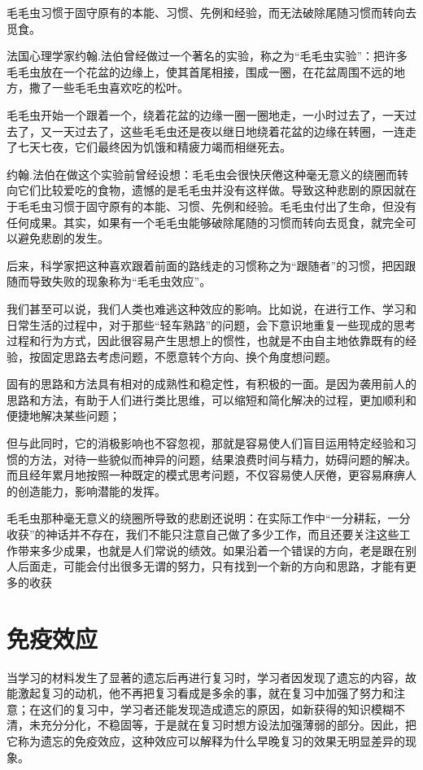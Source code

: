 \documentclass[11pt]{ctexart}
\begin{document}
毛毛虫习惯于固守原有的本能、习惯、先例和经验，而无法破除尾随习惯而转向去觅食。

法国心理学家约翰.法伯曾经做过一个著名的实验，称之为“毛毛虫实验”：把许多毛毛虫放在一个花盆的边缘上，使其首尾相接，围成一圈，在花盆周围不远的地方，撒了一些毛毛虫喜欢吃的松叶。

毛毛虫开始一个跟着一个，绕着花盆的边缘一圈一圈地走，一小时过去了，一天过去了，又一天过去了，这些毛毛虫还是夜以继日地绕着花盆的边缘在转圈，一连走了七天七夜，它们最终因为饥饿和精疲力竭而相继死去。

约翰.法伯在做这个实验前曾经设想：毛毛虫会很快厌倦这种毫无意义的绕圈而转向它们比较爱吃的食物，遗憾的是毛毛虫并没有这样做。导致这种悲剧的原因就在于毛毛虫习惯于固守原有的本能、习惯、先例和经验。毛毛虫付出了生命，但没有任何成果。其实，如果有一个毛毛虫能够破除尾随的习惯而转向去觅食，就完全可以避免悲剧的发生。

后来，科学家把这种喜欢跟着前面的路线走的习惯称之为“跟随者”的习惯，把因跟随而导致失败的现象称为“毛毛虫效应”。

我们甚至可以说，我们人类也难逃这种效应的影响。比如说，在进行工作、学习和日常生活的过程中，对于那些“轻车熟路”的问题，会下意识地重复一些现成的思考过程和行为方式，因此很容易产生思想上的惯性，也就是不由自主地依靠既有的经验，按固定思路去考虑问题，不愿意转个方向、换个角度想问题。

固有的思路和方法具有相对的成熟性和稳定性，有积极的一面。是因为袭用前人的思路和方法，有助于人们进行类比思维，可以缩短和简化解决的过程，更加顺利和便捷地解决某些问题；

但与此同时，它的消极影响也不容忽视，那就是容易使人们盲目运用特定经验和习惯的方法，对待一些貌似而神异的问题，结果浪费时间与精力，妨碍问题的解决。而且经年累月地按照一种既定的模式思考问题，不仅容易使人厌倦，更容易麻痹人的创造能力，影响潜能的发挥。

毛毛虫那种毫无意义的绕圈所导致的悲剧还说明：在实际工作中“一分耕耘，一分收获”的神话并不存在，我们不能只注意自己做了多少工作，而且还要关注这些工作带来多少成果，也就是人们常说的绩效。如果沿着一个错误的方向，老是跟在别人后面走，可能会付出很多无谓的努力，只有找到一个新的方向和思路，才能有更多的收获
\section{免疫效应}
\label{sec-66}


当学习的材料发生了显著的遗忘后再进行复习时，学习者因发现了遗忘的内容，故能激起复习的动机，他不再把复习看成是多余的事，就在复习中加强了努力和注意；在这们的复习中，学习者还能发现造成遗忘的原因，如新获得的知识模糊不清，未充分分化，不稳固等，于是就在复习时想方设法加强薄弱的部分。因此，把它称为遗忘的免疫效应，这种效应可以解释为什么早晚复习的效果无明显差异的现象。
\end{document}
